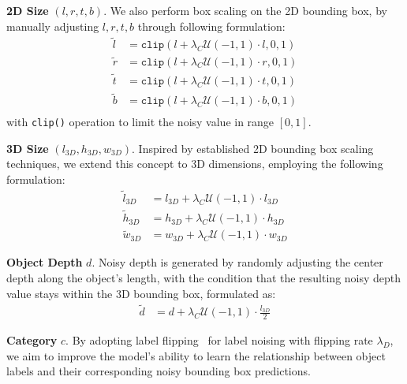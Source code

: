 \textbf{2D Size} $\left(l,r,t,b\right)$. We also perform box scaling on the 2D bounding box, by manually adjusting $l,r,t,b$ through following formulation:
\begin{equation}
    \begin{aligned}
        \widetilde{l} &= \texttt{clip}\left(l + \lambda_C \mathcal{U}(-1, 1) \cdot l, 0, 1\right) \\
        \widetilde{r} &= \texttt{clip}\left(l + \lambda_C \mathcal{U}(-1, 1) \cdot r, 0, 1\right) \\
        \widetilde{t} &= \texttt{clip}\left(l + \lambda_C \mathcal{U}(-1, 1) \cdot t, 0, 1\right) \\
        \widetilde{b} &= \texttt{clip}\left(l + \lambda_C \mathcal{U}(-1, 1) \cdot b, 0, 1\right) \\
    \end{aligned}
\end{equation}
with \texttt{clip()} operation to limit the noisy value in range $\left[0,1\right]$.

\textbf{3D Size} $\left(l_{3D},h_{3D},w_{3D}\right)$. Inspired by established 2D bounding box scaling techniques, we extend this concept to 3D dimensions, employing the following formulation:
\begin{equation}
    \begin{aligned}
        \widetilde{l}_{3D} &= l_{3D} + \lambda_C \mathcal{U}(-1, 1) \cdot l_{3D} \\
        \widetilde{h}_{3D} &= h_{3D} + \lambda_C \mathcal{U}(-1, 1) \cdot h_{3D} \\
        \widetilde{w}_{3D} &= w_{3D} + \lambda_C \mathcal{U}(-1, 1) \cdot w_{3D}
    \end{aligned}
\end{equation}

\textbf{Object Depth} $d$. Noisy depth is generated by randomly adjusting the center depth along the object's length, with the condition that the resulting noisy depth value stays within the 3D bounding box, formulated as:
\begin{equation}
    \begin{aligned}
        \widetilde{d} &= d + \lambda_C \mathcal{U}
        (-1, 1) \cdot \frac{l_{3D}}{2}
    \end{aligned}
\end{equation}

\textbf{Category} $c$. By adopting label flipping~\cite{DN-DETR} for label noising with flipping rate $\lambda_D$, we aim to improve the model's ability to learn the relationship between object labels and their corresponding noisy bounding box predictions.

